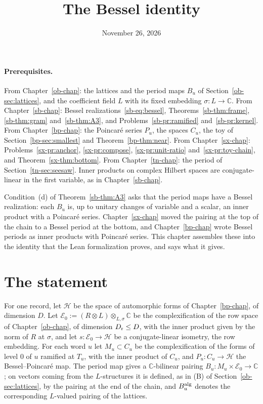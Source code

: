 \documentclass[reqno]{amsart}
\title{The Bessel identity}
\author{}
\date{November 26, 2026}
\newcounter{chap}
\theoremstyle{definition}
\theoremstyle{plain}
\theoremstyle{remark}
\newcommand{\C}{\mathbb C}
\newcommand{\Hc}{\mathcal H}
\newcommand{\Ec}{\mathcal E}
\begin{document}
\maketitle
{}\label{chap}

\paragraph{Prerequisites.}
From Chapter~\ref{ob-chap}: the lattices and the period maps \(B_u\) of Section~\ref{ob-sec:lattices}, and the coefficient field \(L\) with its fixed embedding \(\sigma\colon L\to\C\).  From Chapter~\ref{sb-chap}: Bessel realizations~\eqref{sb-eq:bessel}, Theorems~\ref{sb-thm:frame}, \ref{sb-thm:gram} and~\ref{sb-thm:A3}, and Problems~\ref{sb-pr:ramified} and~\ref{sb-pr:kernel}.  From Chapter~\ref{bp-chap}: the Poincar\'e series \(P_u\), the spaces \(C_u\), the toy of Section~\ref{bp-sec:smallest} and Theorem~\ref{bp-thm:near}.  From Chapter~\ref{sx-chap}: Problems~\ref{sx-pr:anchor}, \ref{sx-pr:compose}, \ref{sx-pr:unit-ratio} and~\ref{sx-pr:toy-chain}, and Theorem~\ref{sx-thm:bottom}.  From Chapter~\ref{tn-chap}: the period of Section~\ref{tn-sec:seesaw}.  Inner products on complex Hilbert spaces are conjugate-linear in the first variable, as in Chapter~\ref{sb-chap}.

\medskip
Condition~(d) of Theorem~\ref{sb-thm:A3} asks that the period maps have a Bessel realization: each \(B_u\) is, up to unitary changes of variable and a scalar, an inner product with a Poincar\'e series.  Chapter~\ref{sx-chap} moved the pairing at the top of the chain to a Bessel period at the bottom, and Chapter~\ref{bp-chap} wrote Bessel periods as inner products with Poincar\'e series.  This chapter assembles these into the identity that the Lean formalization \cite{Lean} proves, and says what it gives.

\section{The statement}\label{sec:statement}

For one record, let \(\Hc\) be the space of automorphic forms of Chapter~\ref{bp-chap}, of dimension \(D\).  Let \(\Ec_0:=(R\otimes L)\otimes_{L,\sigma}\C\) be the complexification of the row space of Chapter~\ref{ob-chap}, of dimension \(D_{\rm r}\le D\), with the inner product given by the norm of \(R\) at \(\sigma\), and let \(s\colon\Ec_0\to\Hc\) be a conjugate-linear isometry, the row embedding.  For each word \(u\) let \(M_u\subset C_u\) be the complexification of the forms of level \(0\) of \(u\) ramified at \(T_u\), with the inner product of \(C_u\), and \(P_u\colon C_u\to\Hc\) the Bessel--Poincar\'e map.  The period map gives a \(\C\)-bilinear pairing \(B_u\colon M_u\times\Ec_0\to\C\); on vectors coming from the \(L\)-structures it is defined, as in (B) of Section~\ref{ob-sec:lattices}, by the pairing at the end of the chain, and \(B_u^{\rm alg}\) denotes the corresponding \(L\)-valued pairing of the lattices.
\end{document}
